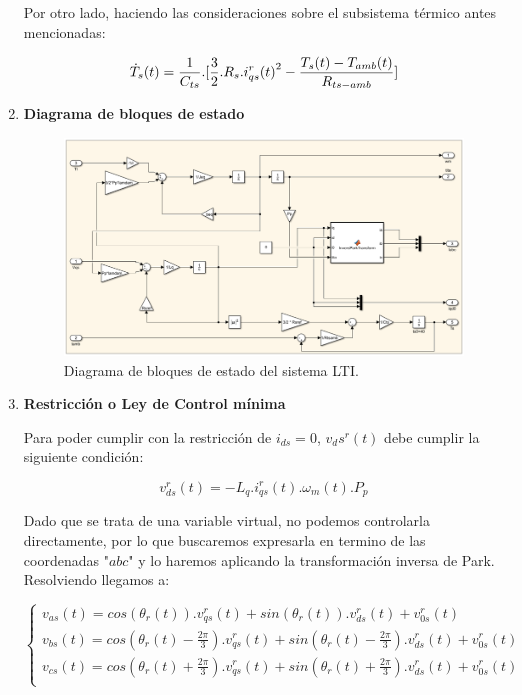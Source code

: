 \documentclass{article}
\begin{document}
\begin{enumerate}[label=\roman*.]
    Por otro lado, haciendo las consideraciones sobre el subsistema térmico antes mencionadas:

    \begin{equation}
        \dot{T}_{s}(t) = \frac{1}{C_{ts}}.[\frac{3}{2}.R_{s}.{i_{qs}^r(t)}^2 - \frac{T_{s}(t)-T_{amb}(t)}{R_{ts-amb}}]\\
    \end{equation}
        
    \item \textbf{Diagrama de bloques de estado}
    
    \begin{figure}[H]
        \centering
        \includegraphics[width=1\textwidth]{LTI.png}
        \caption{Diagrama de bloques de estado del sistema LTI.}
    \end{figure}
    
    \item \textbf{Restricción o Ley de Control mínima}

    Para poder cumplir con la restricción de $i_{ds} = 0$, $v_ds^r(t)$  debe cumplir la siguiente condición:

    \begin{equation}
        v_{ds}^r(t) = -L_{q}.i_{qs}^r(t).\omega_{m}(t).P_{p}
    \end{equation}

    Dado que se trata de una variable virtual, no podemos controlarla directamente, por lo que buscaremos
    expresarla en termino de las coordenadas "$abc$" y lo haremos aplicando la transformación inversa de Park.
    Resolviendo llegamos a:

    \begin{equation}
        \begin{cases}
            v_{as}(t) = cos(\theta_{r}(t)).v_{qs}^r(t) + sin(\theta_{r}(t)).v_{ds}^r(t) + v_{0s}^r(t)\\
            v_{bs}(t) = cos(\theta_{r}(t) - \frac{2\pi}{3}).v_{qs}^r(t) + sin(\theta_{r}(t) - \frac{2\pi}{3}).v_{ds}^r(t) + v_{0s}^r(t)\\
            v_{cs}(t) = cos(\theta_{r}(t) + \frac{2\pi}{3}).v_{qs}^r(t) + sin(\theta_{r}(t) + \frac{2\pi}{3}).v_{ds}^r(t) + v_{0s}^r(t)\\
        \end{cases}
    \end{equation}


\end{enumerate}
\end{document}
